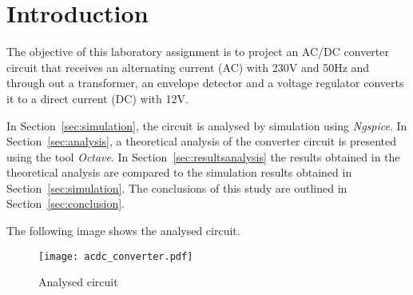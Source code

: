 \section{Introduction}
\label{sec:introduction}

The objective of this laboratory assignment is to project an AC/DC converter circuit that receives an alternating current (AC) with 230V and 50Hz and through out a transformer, an envelope detector and a voltage regulator converts it to a direct current (DC) with 12V. 

In Section~\ref{sec:simulation}, the circuit is analysed by simulation using \textit{Ngspice}. In Section~\ref{sec:analysis}, a theoretical analysis of the converter circuit is presented using the tool \textit{Octave}. In Section~\ref{sec:resultsanalysis} the results obtained in the theoretical analysis are compared to the simulation results obtained in Section~\ref{sec:simulation}. The conclusions of this study are outlined in
Section~\ref{sec:conclusion}.

The following image shows the analysed circuit.

\begin{figure}[h] \centering
\texttt{[image: acdc\_converter.pdf]}
\caption{Analysed circuit}
\label{fig:circuit}
\end{figure}